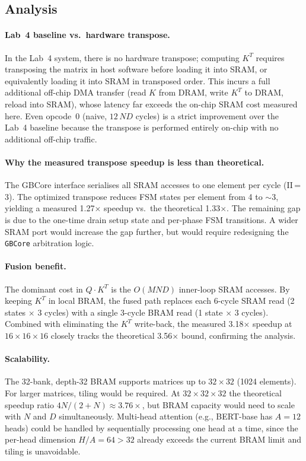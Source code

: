 \documentclass[11pt]{article}
\begin{document}
\subsection{Analysis}

\paragraph{Lab~4 baseline vs.\ hardware transpose.}
In the Lab~4 system, there is no hardware transpose; computing $K^T$ requires
transposing the matrix in host software before loading it into SRAM, or
equivalently loading it into SRAM in transposed order. This incurs a full
additional off-chip DMA transfer (read $K$ from DRAM, write $K^T$ to DRAM,
reload into SRAM), whose latency far exceeds the on-chip SRAM cost measured
here. Even opcode~0 (naive, $12\,ND$ cycles) is a strict improvement over the
Lab~4 baseline because the transpose is performed entirely on-chip with no
additional off-chip traffic.

\paragraph{Why the measured transpose speedup is less than theoretical.}
The GBCore interface serialises all SRAM accesses to one element per cycle
(II\,=\,3). The optimized transpose reduces FSM states per element from 4 to
$\sim$3, yielding a measured 1.27$\times$ speedup vs.\ the theoretical
1.33$\times$. The remaining gap is due to the one-time drain setup state and
per-phase FSM transitions. A wider SRAM port would increase the gap further,
but would require redesigning the \texttt{GBCore} arbitration logic.

\paragraph{Fusion benefit.}
The dominant cost in $Q\!\cdot\!K^T$ is the $O(MND)$ inner-loop SRAM accesses.
By keeping $K^T$ in local BRAM, the fused path replaces each 6-cycle SRAM read
(2 states $\times$ 3 cycles) with a single 3-cycle BRAM read (1 state $\times$
3 cycles). Combined with eliminating the $K^T$ write-back, the measured
3.18$\times$ speedup at $16\!\times\!16\!\times\!16$ closely tracks the
theoretical 3.56$\times$ bound, confirming the analysis.

\paragraph{Scalability.}
The 32-bank, depth-32 BRAM supports matrices up to $32\!\times\!32$ (1024
elements). For larger matrices, tiling would be required. At
$32\!\times\!32\!\times\!32$ the theoretical speedup ratio
$4N/(2\!+\!N) \approx 3.76\times$, but BRAM capacity would need to scale
with $N$ and $D$ simultaneously. Multi-head attention (e.g., BERT-base has
$A=12$ heads) could be handled by sequentially processing one head at a time,
since the per-head dimension $H/A = 64 > 32$ already exceeds the current BRAM
limit and tiling is unavoidable.
\end{document}

